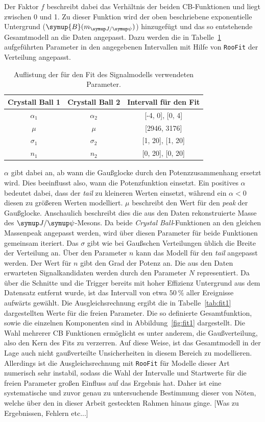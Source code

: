 %
Der Faktor $f$ beschreibt dabei das Verhältnis der beiden CB-Funktionen und liegt zwischen 0 und 1. Zu dieser Funktion wird der oben beschriebene exponentielle Untergrund ($\symup{B}(m_{\jpsi})$) hinzugefügt und das so entstehende Gesamtmodell an die Daten angepasst. Dazu werden die in Tabelle~\ref{tab:params} aufgeführten Parameter in den angegebenen Intervallen mit Hilfe von \texttt{RooFit} der Verteilung angepasst.
%
%
\begin{table}[H]
  \centering
  \caption{Auflistung der für den Fit des Signalmodells verwendeten Parameter.}
  \begin{tabular}{ccc}
    \toprule
    \textbf{Crystall Ball 1}    & \textbf{Crystall Ball 2} & Intervall für den Fit \\
    \midrule
    $\alpha_1$                  & $\alpha_2$               & [-4, 0], [0, 4] \\
    $\mu$                       & $\mu$                    & [2946, 3176] \\
    $\sigma_1$                  & $\sigma_2$               & [1, 20], [1, 20] \\
    $n_1$                       & $n_2$                    & [0, 20], [0, 20] \\
    \bottomrule
  \end{tabular}
  \label{tab:params}
\end{table}
%
$\alpha$ gibt dabei an, ab wann die Gaußglocke durch den Potenzzusammenhang ersetzt wird. Dies beeinflusst also, wann die Potenzfunktion
einsetzt. Ein positives $\alpha$ bedeutet dabei, dass der \textit{tail} zu kleineren Werten einsetzt, während ein $\alpha<0$
diesen zu größeren Werten modelliert. $\mu$ beschreibt den Wert für den \textit{peak} der Gaußglocke. Anschaulich beschreibt dies die aus
den Daten rekonstruierte Masse des $\jpsi$-Mesons. Da beide \textit{Crystal Ball}-Funktionen an den gleichen Massenpeak angepasst werden,
wird über diesen Parameter für beide Funktionen gemeinsam iteriert. Das $\sigma$ gibt wie bei Gaußschen Verteilungen üblich die Breite der Verteilung an. Über den Parameter $n$ kann das Modell für den \textit{tail} angepasst werden. Der Wert für $n$ gibt den Grad der Potenz
an. Die aus den Daten erwarteten Signalkandidaten werden durch den Parameter $N$ representiert. Da über die Schnitte und die Trigger bereits mit hoher Effizienz Untergrund aus dem Datensatz entfernt wurde, ist das Intervall von etwa $\SI{50}{\percent}$ aller Ereignisse aufwärts gewählt.
Die Ausgleichsrechnung ergibt die in Tabelle~\ref{tab:fit1} dargestellten Werte für die freien Parameter. Die so definierte Gesamtfunktion, sowie die einzelnen Komponenten sind in Abbildung~\ref{fig:fit1} dargestellt. Die Wahl mehrerer CB Funktionen ermöglicht es unter anderem, die Gaußverteilung, also den Kern des Fits zu verzerren. Auf diese Weise, ist das Gesamtmodell in der Lage auch nicht gaußverteilte Unsicherheiten in diesem Bereich zu modellieren. Allerdings ist die Ausgleichsrechnung mit \texttt{RooFit} für Modelle dieser Art numerisch sehr instabil, sodass die Wahl der Intervalle und Startwerte für die freien Parameter großen Einfluss auf das Ergebnis hat. Daher ist eine systematische und zuvor genau zu untersuchende Bestimmung dieser von Nöten, welche über den in dieser Arbeit gesteckten Rahmen hinaus ginge. [Was zu Ergebnissen, Fehlern etc...]
